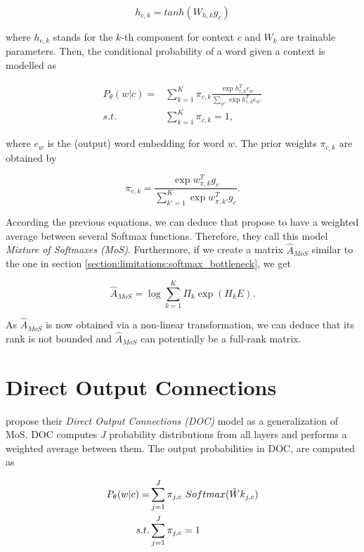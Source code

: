 \begin{displaymath}
    h_{c, k} = tanh(W_{h,k} g_c)
\end{displaymath}

where $ h_{c, k} $ stands for the $ k $-th component for context $ c $ and $ W_k $ are trainable parameters. Then, the conditional probability of a word given a context is modelled as

\begin{align*}
    P_\theta(w | c) = &\sum_{k=1}^K \pi_{c, k} \frac{\exp{h^T_{c, k} e_w}}{\sum_{w'} \exp{h^T_{c, k} e_{w'}}} \\
    s.t. &\sum_{k=1}^K \pi_{c, k} = 1,
\end{align*}

where $ e_w $ is the (output) word embedding for word $ w $. The prior weights $ \pi_{c, k} $ are obtained by

\begin{displaymath}
    \pi_{c, k} = \frac{\exp{w_{\pi, k}^T g_c}}{\sum_{k'=1}^K \exp{w_{\pi, k'}^T g_c}}.
\end{displaymath}

According the previous equations, we can deduce that \citet{yang2017breaking} propose to have a weighted average between several Softmax functions. Therefore, they call this model \emph{Mixture of Softmaxes (MoS)}. Furthermore, if we create a matrix $ \hat{A}_{MoS} $ similar to the one in section \ref{section:limitations:softmax_bottleneck}, we get

\begin{displaymath}
    \hat{A}_{MoS} = \log \sum_{k=1}^K \Pi_k \exp (H_{k}E).
\end{displaymath}

As $ \hat{A}_{MoS} $ is now obtained via a non-linear transformation, we can deduce that its rank is not bounded and $ \hat{A}_{MoS} $ can potentially be a full-rank matrix.

\section{Direct Output Connections}
\label{section:related_work:doc}

\citet{takase2018direct} propose their \emph{Direct Output Connections (DOC)} model as a generalization of MoS. DOC computes $ J $ probability distributions from all layers and performs a weighted average between them. The output probabilities in DOC, are computed as

\begin{align*}
    P_\theta(w | c) = &\sum_{j=1}^J \pi_{j, c} \ Softmax(\Tilde{W}k_{j,c}) \\
    s.t. &\sum_{j=1}^J \pi_{j, c} = 1
\end{align*}

